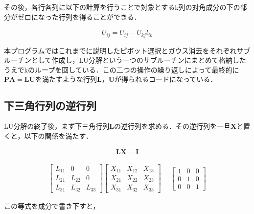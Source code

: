 \documentclass[dvipdfmx]{jsarticle}
\begin{document}
その後，各行各列に以下の計算を行うことで対象とするk列の対角成分の下の部分がゼロになった行列を得ることができる．

\begin{align}
    U_{ij}=U_{ij}-U_{kj}l_{ik}
\end{align}

本プログラムではこれまでに説明したピボット選択とガウス消去をそれぞれサブルーチンとして作成し，LU分解という一つのサブルーチンにまとめて格納したうえでkのループを回している．この二つの操作の繰り返しによって最終的に$\boldsymbol{PA}=\boldsymbol{LU}$を満たすような行列$\boldsymbol{L}$，$\boldsymbol{U}$が得られるコードになっている．\\

\subsection{下三角行列の逆行列}
LU分解の終了後，まず下三角行列$\boldsymbol{L}$の逆行列を求める．その逆行列を一旦$\boldsymbol{X}$と置くと，以下の関係を満たす．

\begin{align}
    \boldsymbol{LX}=\boldsymbol{I}
\end{align}

\begin{align}
    \begin{bmatrix}
        L_{11} & 0 & 0 \\
        L_{21} & L_{22} & 0 \\
        L_{31} & L_{32} & L_{33}
    \end{bmatrix}
    \begin{bmatrix}
        X_{11} & X_{12} & X_{13} \\
        X_{21} & X_{22} & X_{23} \\
        X_{31} & X_{32} & X_{33}
    \end{bmatrix}
    =
    \begin{bmatrix}
        1 & 0 & 0 \\
        0 & 1 & 0 \\
        0 & 0 & 1
    \end{bmatrix}
\end{align}

この等式を成分で書き下すと，
\end{document}
